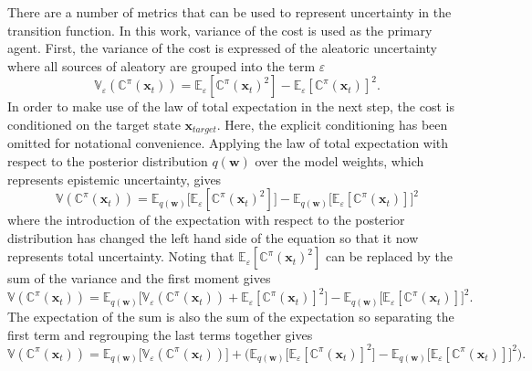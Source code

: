 There are a number of metrics that can be used to represent uncertainty in the transition function. In this work, variance of the cost is used as the primary agent. First, the variance of the cost is expressed of the aleatoric uncertainty where all sources of aleatory are grouped into the term  $\varepsilon$
\begin{equation}
    \mathbb{V}_{\varepsilon}\left(\mathbb{C}^{\pi}\left(\mathbf{x}_{t}\right)\right)=\mathbb{E}_{\varepsilon}\left[\mathbb{C}^{\pi}(\mathbf{x}_{t})^{2}\right] - \mathbb{E}_{\varepsilon}\left[\mathbb{C}^{\pi}(\mathbf{x}_{t})\right]^{2}.
\end{equation}
In order to make use of the law of total expectation in the next step, the cost is conditioned on the target state $\mathbf{x}_{target}$. Here, the explicit conditioning has been omitted for notational convenience. Applying the law of total expectation with respect to the posterior distribution $q(\mathbf{w})$ over the model weights, which represents epistemic uncertainty, gives
\begin{equation}
    \mathbb{V}\left(\mathbb{C}^{\pi}\left(\mathbf{x}_{t}\right)\right)=\mathbb{E}_{q(\mathbf{w})}\big[\mathbb{E}_{\varepsilon}\left[\mathbb{C}^{\pi}(\mathbf{x}_{t})^{2}\right]\big] - \mathbb{E}_{q(\mathbf{w})}\big[\mathbb{E}_{\varepsilon}\left[\mathbb{C}^{\pi}(\mathbf{x}_{t})\right]\big]^{2}
\end{equation}
where the introduction of the expectation with respect to the posterior distribution has changed the left hand side of the equation so  that it now represents total uncertainty. Noting that $\mathbb{E}_{\varepsilon}\left[\mathbb{C}^{\pi}(\mathbf{x}_{t})^{2}\right]$ can be replaced by the sum of the variance and the first moment gives
\begin{equation}
    \mathbb{V}\left(\mathbb{C}^{\pi}\left(\mathbf{x}_{t}\right)\right)=\mathbb{E}_{q(\mathbf{w})}\big[\mathbb{V}_{\varepsilon}\left(\mathbb{C}^{\pi}(\mathbf{x}_{t})\right)+\mathbb{E}_{\varepsilon}\left[\mathbb{C}^{\pi}(\mathbf{x}_{t})\right]^{2}\big] - \mathbb{E}_{q(\mathbf{w})}\big[\mathbb{E}_{\varepsilon}\left[\mathbb{C}^{\pi}(\mathbf{x}_{t})\right]\big]^{2}.
\end{equation}
The expectation of the sum is also the sum of the expectation so separating the first term and regrouping the last terms together gives
\begin{equation}
    \mathbb{V}\left(\mathbb{C}^{\pi}\left(\mathbf{x}_{t}\right)\right)=\mathbb{E}_{q(\mathbf{w})}\big[\mathbb{V}_{\varepsilon}\left(\mathbb{C}^{\pi}(\mathbf{x}_{t})\right)\big] + \bigg(\mathbb{E}_{q(\mathbf{w})}\big[\mathbb{E}_{\varepsilon}\left[\mathbb{C}^{\pi}(\mathbf{x}_{t})\right]^{2}\big]- \mathbb{E}_{q(\mathbf{w})}\big[\mathbb{E}_{\varepsilon}\left[\mathbb{C}^{\pi}(\mathbf{x}_{t})\right]\big]^{2}\bigg).
\end{equation}
